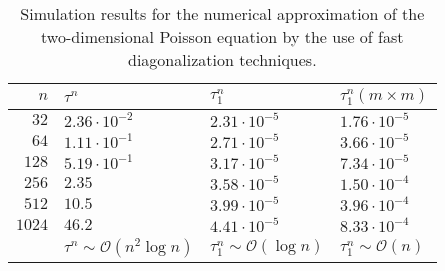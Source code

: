 \begin{table}[h]
  \begin{center}
    \begin{tabular}{|r|l|l|l|}
      \hline
      $n$ & $\tau^n$ & $\tau_1^n$ & $\tau_1^n (m \times m)$ \\
      \hline
      $32$ & $2.36 \cdot 10^{-2}$ & $2.31 \cdot 10^{-5}$ & $1.76 \cdot 10^{-5}$ \\
      $64$ & $1.11 \cdot 10^{-1}$ & $2.71 \cdot 10^{-5}$ & $3.66 \cdot 10^{-5}$ \\
      $128$ & $5.19 \cdot 10^{-1}$ & $3.17 \cdot 10^{-5}$ & $7.34 \cdot 10^{-5}$ \\
      $256$ & $2.35$ & $3.58 \cdot 10^{-5}$ & $1.50 \cdot 10^{-4}$ \\
      $512$ & $10.5$ & $3.99 \cdot 10^{-5}$ & $3.96 \cdot 10^{-4}$ \\
      $1024$ & $46.2$ & $4.41 \cdot 10^{-5}$ & $8.33 \cdot 10^{-4}$ \\
      \hline
      & $\tau^n \sim \mathcal{O}(n^2 \log n)$ & $\tau_1^n \sim \mathcal{O}(\log n)$ & $\tau_1^n \sim \mathcal{O}(n) $ \\
      \hline
    \end{tabular}
  \end{center}
  \caption{Simulation results for the numerical approximation of the two-dimensional Poisson equation by the use of fast diagonalization techniques.}
\end{table}

